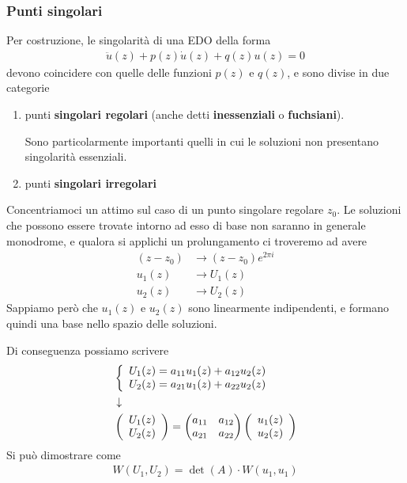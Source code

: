 \subsubsection{Punti singolari}

Per costruzione, le singolarità di una EDO della forma
\begin{align}
	\ddot{u}(z) + p(z) \dot{u}(z) + q(z)u(z) = 0
\end{align}
devono coincidere con quelle delle funzioni $p(z)$ e $q(z)$, e sono divise in due categorie
\begin{enumerate}
	\item punti \textbf{singolari regolari} (anche detti \textbf{inessenziali} o \textbf{fuchsiani}).
	
	Sono particolarmente importanti quelli in cui le soluzioni non presentano singolarità essenziali.
	\item punti \textbf{singolari irregolari}
\end{enumerate}
Concentriamoci un attimo sul caso di un punto singolare regolare $z_0$. Le soluzioni che possono essere trovate intorno ad esso di base non saranno in generale monodrome, e qualora si applichi un prolungamento ci troveremo ad avere
\begin{align}
	(z-z_0) &\to (z-z_0)e^{2\pi i}\\
	u_1(z)  &\to U_1(z)\\
	u_2(z)  &\to U_2(z)
\end{align}
\newpage
Sappiamo però che $u_1(z)$ e $u_2(z)$ sono linearmente indipendenti, e formano quindi una base nello spazio delle soluzioni.

Di conseguenza possiamo scrivere
\begin{align}
	&\left\{ \begin{array}{cc} U_1(z) = a_{11} u_1(z) + a_{12} u_2(z)\\ U_2(z) = a_{21} u_1(z) + a_{22} u_2(z) \end{array} \right.\\ &\downarrow \nonumber \\
	&\left(
	 \begin{array}{c}
		 U_1(z)\\
		 U_2(z)
	 \end{array}\right) = 
	 \begin{pmatrix}
		 a_{11} & a_{12}\\
		 a_{21} & a_{22}
	 \end{pmatrix} 	\left(
     \begin{array}{c}
		 u_1(z)\\
		 u_2(z)
	\end{array}\right)
\end{align}
Si può dimostrare come
\begin{align}
	W(U_1,U_2) = \det(A) \cdot W(u_1, u_1)
\end{align}

